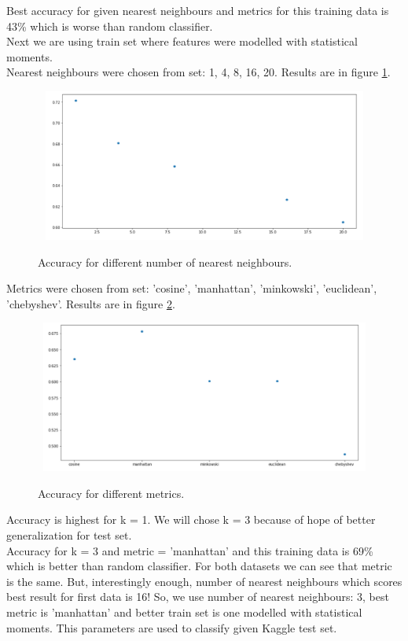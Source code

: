 \documentclass{article}
\begin{document}
Best accuracy for given nearest neighbours and metrics for this training data is 43\% which is worse than random classifier.\\

Next we are using train set where features were modelled with statistical moments.\\

Nearest neighbours were chosen from set: {1, 4, 8, 16, 20}. Results are in figure \ref{fig:knnNN2}.\\

\begin{figure}[!htb]
\includegraphics[width=12cm, height=5cm]{knnNN2}\\
\caption{Accuracy for different number of nearest neighbours.}
\label{fig:knnNN2}
\centering
\end{figure}


Metrics were chosen from set: {'cosine', 'manhattan', 'minkowski', 'euclidean', 'chebyshev'}. Results are in figure \ref{fig:knnmet2}.\\

\begin{figure}[!htb]
\includegraphics[width=12cm, height=5cm]{knnMet2}\\
\caption{Accuracy for different metrics.}
\label{fig:knnmet2}
\centering
\end{figure}

Accuracy is highest for k = 1. We will chose k = 3 because of hope of better generalization for test set.\\
Accuracy for k = 3 and metric = 'manhattan' and this training data is 69\% which is better than random classifier. 
For both datasets we can see that metric is the same. But, interestingly enough, number of nearest neighbours which
scores best result for first data is 16! 
So, we use number of nearest neighbours: 3, best metric is 'manhattan' and better train set is one modelled with statistical
moments. This parameters are used to classify given Kaggle test set.\\
\end{document}
